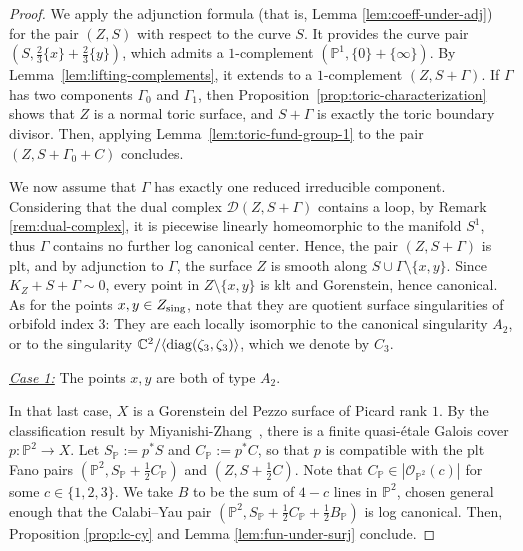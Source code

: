 \documentclass{amsart}
\newcommand{\pp}{\mathbb{P}}
\theoremstyle{definition}
\theoremstyle{remark}
\numberwithin{equation}{section}
\begin{document}
\begin{proof}
We apply the adjunction formula (that is, Lemma \ref{lem:coeff-under-adj}) for the pair $(Z,S)$ with respect to the curve $S$. It  provides the curve pair $(S,\frac{2}{3}\{x\}+\frac{2}{3}\{y\})$, which admits a $1$-complement $(\pp^1,\{0\}+\{\infty\})$. By Lemma~\ref{lem:lifting-complements}, it extends to a $1$-complement $(Z,S+\Gamma)$. 
If $\Gamma$ has two components $\Gamma_0$ and $\Gamma_1$, then Proposition~\ref{prop:toric-characterization} shows that $Z$ is a normal toric surface, and $S+\Gamma$ is exactly the toric boundary divisor. Then, applying Lemma~\ref{lem:toric-fund-group-1} to the pair $(Z,S+\Gamma_0+C)$ concludes.

We now assume that $\Gamma$ has exactly one reduced irreducible component.  Considering that the dual complex $\mathcal{D}(Z,S+\Gamma)$ contains a loop, by Remark \ref{rem:dual-complex}, it is piecewise linearly homeomorphic to the manifold $S^1$, thus $\Gamma$ contains no further log canonical center. Hence, the pair $(Z,S+\Gamma)$ is plt, and by adjunction to $\Gamma$, the surface $Z$ is smooth along $S\cup \Gamma \setminus\{x,y\}$. Since $K_Z+S+\Gamma\sim 0$, every point in $Z\setminus \{x,y\}$ is klt and Gorenstein, hence canonical. As for the points $x,y\in Z_{\rm sing}$, note that they are quotient surface singularities of orbifold index $3$: They are each locally isomorphic to the canonical singularity $A_2$, or to the singularity $\mathbb{C}^2/\langle{\rm diag}(\zeta_3,\zeta_3)\rangle$, which we denote by $C_3$.



\medskip
\noindent\underline{\textit{Case 1:}} The points $x,y$ are both of type $A_2$.

\noindent In that last case, $X$ is a Gorenstein del Pezzo surface of Picard rank $1$. By the classification result by Miyanishi-Zhang~\cite[Lemma 6]{MZ88}, there is a finite quasi-\'etale Galois cover $p:\pp^2 \rightarrow X$. Let $S_{\pp}:=p^*S$ and $C_{\mathbb P}:=p^*C$, so that $p$ is compatible with the plt Fano pairs $(\pp^2,S_{\mathbb P}+\frac{1}{2}C_{\mathbb P})$ and $(Z,S+\frac{1}{2}C)$. 
Note that $C_{\pp}\in|\mathcal{O}_{\pp^2}(c)|$ for some $c\in\{1,2,3\}$. We take $B$ to be the sum of $4-c$ lines in $\pp^2$, chosen general enough that the Calabi--Yau pair $(\pp^2,S_{\pp}+\frac{1}{2}C_{\pp}+\frac{1}{2}B_{\pp})$ is log canonical. Then, Proposition \ref{prop:lc-cy} and Lemma \ref{lem:fun-under-surj} conclude.


\end{proof}
\end{document}
